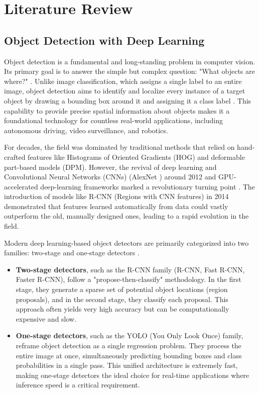 \chapter{Literature Review}
\label{chap:lit_review}

\section{Object Detection with Deep Learning}
\label{sec:lit_object_detection}

Object detection is a fundamental and long-standing problem in computer vision. Its primary goal is to answer the simple but complex question: "What objects are where?" \cite{zou2023object}. Unlike image classification, which assigns a single label to an entire image, object detection aims to identify and localize every instance of a target object by drawing a bounding box around it and assigning it a class label \cite{wu2019recent}. This capability to provide precise spatial information about objects makes it a foundational technology for countless real-world applications, including autonomous driving, video surveillance, and robotics.

For decades, the field was dominated by traditional methods that relied on hand-crafted features like Histograms of Oriented Gradients (HOG) \cite{dalal2005histograms} and deformable part-based models (DPM). However, the revival of deep learning and Convolutional Neural Networks (CNNs) (AlexNet \cite{krizhevsky2012imagenet}) around 2012 and GPU-accelerated deep-learning frameworks marked a revolutionary turning point \cite{zou2023object}. The introduction of models like R-CNN (Regions with CNN features) \cite{girshick2014rich} in 2014 demonstrated that features learned automatically from data could vastly outperform the old, manually designed ones, leading to a rapid evolution in the field.

Modern deep learning-based object detectors are primarily categorized into two families: two-stage and one-stage detectors \cite{wu2019recent}.
\begin{itemize}
    \item \textbf{Two-stage detectors}, such as the R-CNN family (R-CNN, Fast R-CNN, Faster R-CNN), follow a "propose-then-classify" methodology. In the first stage, they generate a sparse set of potential object locations (region proposals), and in the second stage, they classify each proposal. This approach often yields very high accuracy but can be computationally expensive and slow.
    \item \textbf{One-stage detectors}, such as the YOLO (You Only Look Once) \cite{redmon2016you} family, reframe object detection as a single regression problem. They process the entire image at once, simultaneously predicting bounding boxes and class probabilities in a single pass. This unified architecture is extremely fast, making one-stage detectors the ideal choice for real-time applications where inference speed is a critical requirement.
\end{itemize}

